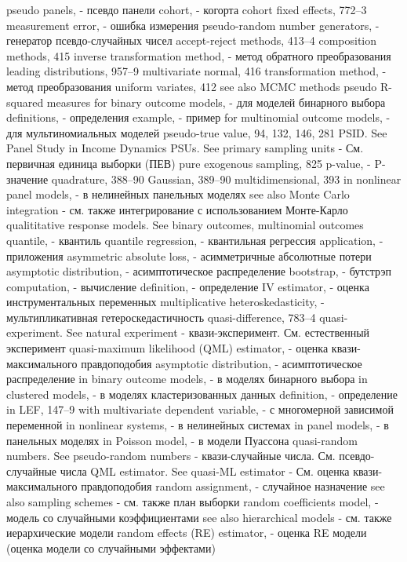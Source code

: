 pseudo panels, - псевдо панели
cohort, - когорта
cohort fixed effects, 772–3 
measurement error, - ошибка измерения
pseudo-random number generators, - генератор псевдо-случайных чисел 
accept-reject methods, 413–4
composition methods, 415
inverse transformation method, - метод обратного преобразования
leading distributions, 957–9 multivariate normal, 416 
transformation method, - метод преобразования
uniform variates, 412
see also MCMC methods pseudo R-squared measures
for binary outcome models, - для моделей бинарного выбора
definitions, - определения
example, - пример
for multinomial outcome models, - для мультиномиальных моделей
pseudo-true value, 94, 132, 146, 281
PSID. See Panel Study in Income Dynamics PSUs. 
See primary sampling units - См. первичная единица выборки (ПЕВ)
pure exogenous sampling, 825
p-value, - P-значение
quadrature, 388–90
Gaussian, 389–90
multidimensional, 393
in nonlinear panel models, - в нелинейных панельных моделях 
see also Monte Carlo integration - см. также интегрирование с использованием Монте-Карло
qualititative response models. See binary outcomes, multinomial outcomes
quantile, - квантиль
quantile regression, - квантильная регрессия
application, - приложения
asymmetric absolute loss, - асимметричные абсолютные потери 
asymptotic distribution, - асимптотическое распределение
bootstrap, - бутстрэп
computation, - вычисление
definition, - определение
IV estimator, - оценка инструментальных переменных
multiplicative heteroskedasticity, - мультипликативная гетероскедастичность
quasi-difference, 783–4
quasi-experiment. See natural experiment - квази-эксперимент. См. естественный эксперимент
quasi-maximum likelihood (QML) estimator, - оценка квази-максимального правдоподобия
asymptotic distribution, - асимптотическое распределение
in binary outcome models, - в моделях бинарного выбора
in clustered models, - в моделях кластеризованных данных
definition, - определение
in LEF, 147–9
with multivariate dependent variable, - с многомерной зависимой переменной
in nonlinear systems, - в нелинейных системах
in panel models, - в панельных моделях
in Poisson model, - в модели Пуассона
quasi-random numbers. See pseudo-random numbers - квази-случайные числа. См. псевдо-случайные числа
QML estimator. See quasi-ML estimator - См. оценка квази-максимального правдоподобия
random assignment, - случайное назначение 
see also sampling schemes - см. также план выборки
random coefficients model, - модель со случайными коэффициентами
see also hierarchical models - см. также иерархические модели
random effects (RE) estimator, - оценка RE модели (оценка модели со случайными эффектами)
